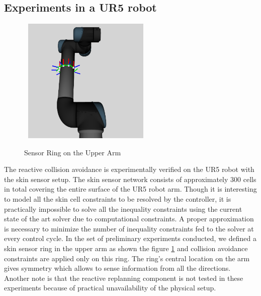 \subsection{Experiments in a UR5 robot}
\begin{figure}[H]
\centering
{\includegraphics[width=6.5cm,height=6cm]{chapters/doa/images/delft/ring_sensors.png}}
\caption{Sensor Ring on the Upper Arm}
\label{fig:ringsensors}
\end{figure}
The reactive collision avoidance is experimentally verified on the UR5 robot with the skin sensor setup. The skin sensor network  consists of approximately 300 cells in total covering the entire surface of the UR5 robot arm. Though it is interesting to model all the skin cell constraints to be resolved by the controller, it is practically impossible to solve all the inequality constraints using the current state of the art solver due to computational constraints. A proper approximation is necessary to minimize the number of inequality constraints fed to the solver at every control cycle. In the set of preliminary experiments conducted, we defined a skin sensor ring in the upper arm as shown the figure \ref{fig:ringsensors} and collision avoidance constraints are applied only on this ring. The ring's central location on the arm gives symmetry which allows to sense information from all the directions. Another note is that the reactive replanning component is not tested in these experiments because of practical unavailability of the physical setup. 

